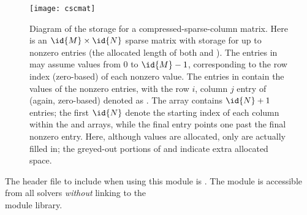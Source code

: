 \begin{figure}
\centerline{\texttt{[image: cscmat]}}
\caption[Diagram of the storage for a compressed-sparse-column matrix] 
  {Diagram of the storage for a compressed-sparse-column
  matrix. Here  is an $\id{M} \times \id{N}$ sparse matrix with storage
  for up to  nonzero entries (the allocated length of
  both  and ).  The entries in 
  may assume values from $0$ to $\id{M}-1$, corresponding to the row index
  (zero-based) of each nonzero value.  The entries in  contain
  the values of the nonzero entries, with the row $i$, column $j$
  entry of  (again, zero-based) denoted as .
  The  array contains $\id{N}+1$ entries; the first $\id{N}$
  denote the starting index of each column within the 
  and  arrays, while the final entry points one past the
  final nonzero entry.  Here, although  values are allocated,
  only  are actually filled in; the greyed-out portions
  of  and  indicate extra allocated
  space.}\label{f:sparsemat} 
\end{figure}

\noindent The header file to include when using this module 
is . The {\sunmatsparse} module
is accessible from all {\sundials} solvers \textit{without}
linking to the \\
 module library. \\

